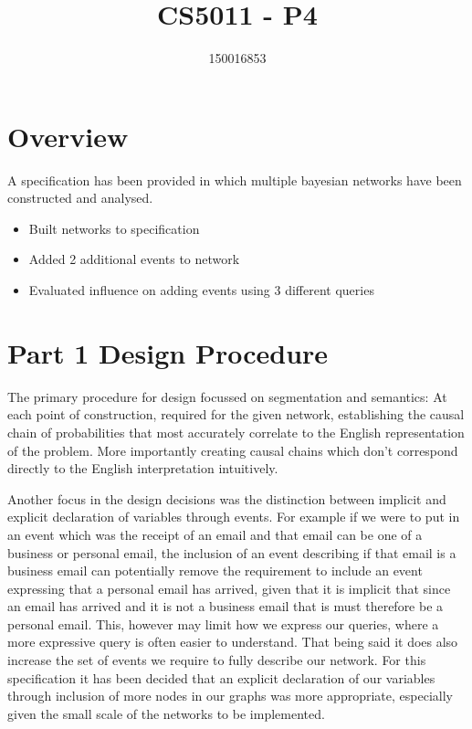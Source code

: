 \documentclass[10pt,a4paper]{article}
\author{150016853}
\title{CS5011 - P4}
\begin{document}
\maketitle

\section{Overview}

A specification has been provided in which multiple bayesian networks have been constructed and analysed. 

\begin{itemize}
\item Built networks to specification
\item Added 2 additional events to network
\item Evaluated influence on adding events using 3 different queries
\end{itemize}


\section{Part 1 Design Procedure}

The primary procedure for design focussed on segmentation and semantics: At each point of construction, required for the given network,  establishing the causal chain of probabilities that most accurately correlate to the English representation of the problem. More importantly creating causal chains which don't correspond directly to the English interpretation intuitively. 

Another focus in the design decisions was the distinction between implicit and explicit declaration of variables through events. For example if we were to put in an event which was the receipt of an email and that email can be one of a business or personal email, the inclusion of an event describing if that email is a business email can potentially remove the requirement to include an event expressing that a personal email has arrived, given that it is implicit that since an email has arrived and it is not a business email that is must therefore be a personal email. This, however may limit how we express our queries, where a more expressive query is often easier to understand. That being said it does also increase the set of events we require to fully describe our network. For this specification it has been decided that an explicit declaration of our variables through inclusion of more nodes in our graphs was more appropriate, especially given the small scale of the networks to be implemented.
\end{document}
